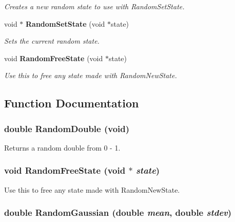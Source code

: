 \begin{CompactItemize}
\begin{CompactList}\small\item\em Creates a new random state to use with Random\-Set\-State. \item\end{CompactList}\item 
void $\ast$ {\bf Random\-Set\-State} (void $\ast$state)
\begin{CompactList}\small\item\em Sets the current random state. \item\end{CompactList}\item 
void {\bf Random\-Free\-State} (void $\ast$state)
\begin{CompactList}\small\item\em Use this to free any state made with Random\-New\-State. \item\end{CompactList}\end{CompactItemize}


\subsection{Function Documentation}
\subsubsection{\setlength{\rightskip}{0pt plus 5cm}double Random\-Double (void)}\label{random_8h_a3}


Returns a random double from 0 - 1. 

\subsubsection{\setlength{\rightskip}{0pt plus 5cm}void Random\-Free\-State (void $\ast$ {\em state})}\label{random_8h_a9}


Use this to free any state made with Random\-New\-State. 

\subsubsection{\setlength{\rightskip}{0pt plus 5cm}double Random\-Gaussian (double {\em mean}, double {\em stdev})}\label{random_8h_a4}


